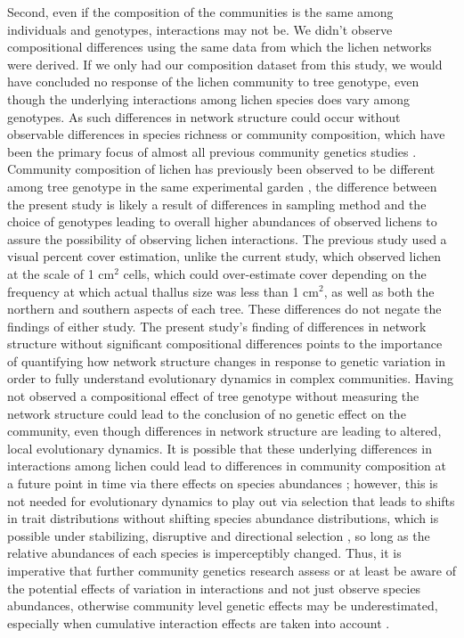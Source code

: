 \documentclass[fleqn,12pt]{olplainarticle}
\begin{document}
Second, even if the composition of the communities is the same among
individuals and genotypes, interactions may not be. We didn't observe
compositional differences using the same data from which the lichen
networks were derived. If we only had our composition dataset from
this study, we would have concluded no response of the lichen
community to tree genotype, even though the underlying interactions
among lichen species does vary among genotypes. As such differences in
network structure could occur without observable differences in
species richness or community composition, which have been the primary
focus of almost all previous community genetics studies
\citep{DesRoches2018TheVariation}. Community composition of lichen has
previously been observed to be different among tree genotype in the
same experimental garden \citep{Lamit2011, Lamit2015a}, the difference
between the present study is likely a result of differences in
sampling method and the choice of genotypes leading to overall higher
abundances of observed lichens to assure the possibility of observing
lichen interactions. The previous study used a visual percent cover
estimation, unlike the current study, which observed lichen at the
scale of 1 cm$^2$ cells, which could over-estimate cover depending on
the frequency at which actual thallus size was less than 1 cm$^2$, as
well as both the northern and southern aspects of each tree. These
differences do not negate the findings of either study. The present
study's finding of differences in network structure without
significant compositional differences points to the importance of
quantifying how network structure changes in response to genetic
variation in order to fully understand evolutionary dynamics in
complex communities. Having not observed a compositional effect of
tree genotype without measuring the network structure could lead to
the conclusion of no genetic effect on the community, even though
differences in network structure are leading to altered, local
evolutionary dynamics. It is possible that these underlying
differences in interactions among lichen could lead to differences in
community composition at a future point in time via there effects on
species abundances \citep{Shuster2006COMMUNITYSTRUCTURE}; however,
this is not needed for evolutionary dynamics to play out via selection
that leads to shifts in trait distributions without shifting species
abundance distributions, which is possible under stabilizing,
disruptive and directional selection \citep{Conner2004ATextbook}, so
long as the relative abundances of each species is imperceptibly
changed. Thus, it is imperative that further community genetics
research assess or at least be aware of the potential effects of
variation in interactions and not just observe species abundances,
otherwise community level genetic effects may be underestimated,
especially when cumulative interaction effects are taken into account
\citep{Borrett2007FunctionalProliferation}.
\end{document}
